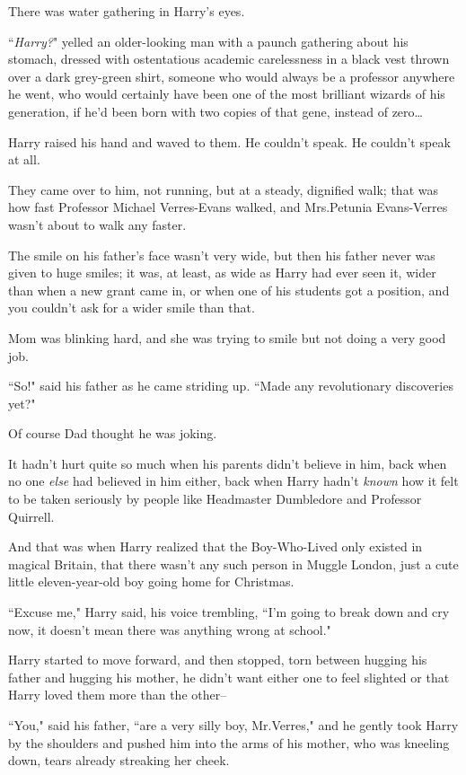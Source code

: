 There was water gathering in Harry's eyes.

``\emph{Harry?}" yelled an older-looking man with a paunch gathering about his stomach, dressed with ostentatious academic carelessness in a black vest thrown over a dark grey-green shirt, someone who would always be a professor anywhere he went, who would certainly have been one of the most brilliant wizards of his generation, if he'd been born with two copies of that gene, instead of zero{\ldots}

Harry raised his hand and waved to them. He couldn't speak. He couldn't speak at all.

They came over to him, not running, but at a steady, dignified walk; that was how fast Professor Michael Verres-Evans walked, and Mrs.\?Petunia Evans-Verres wasn't about to walk any faster.

The smile on his father's face wasn't very wide, but then his father never was given to huge smiles; it was, at least, as wide as Harry had ever seen it, wider than when a new grant came in, or when one of his students got a position, and you couldn't ask for a wider smile than that.

Mom was blinking hard, and she was trying to smile but not doing a very good job.

``So!" said his father as he came striding up. ``Made any revolutionary discoveries yet?"

Of course Dad thought he was joking.

It hadn't hurt quite so much when his parents didn't believe in him, back when no one \emph{else} had believed in him either, back when Harry hadn't \emph{known} how it felt to be taken seriously by people like Headmaster Dumbledore and Professor Quirrell.

And that was when Harry realized that the Boy-Who-Lived only existed in magical Britain, that there wasn't any such person in Muggle London, just a cute little eleven-year-old boy going home for Christmas.

``Excuse me," Harry said, his voice trembling, ``I'm going to break down and cry now, it doesn't mean there was anything wrong at school."

Harry started to move forward, and then stopped, torn between hugging his father and hugging his mother, he didn't want either one to feel slighted or that Harry loved them more than the other\---

``You," said his father, ``are a very silly boy, Mr.\?Verres," and he gently took Harry by the shoulders and pushed him into the arms of his mother, who was kneeling down, tears already streaking her cheek.


